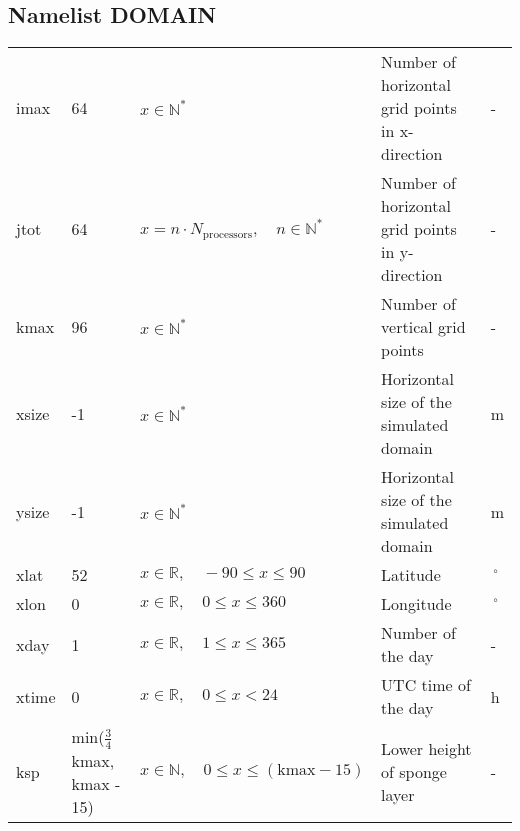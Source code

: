 \documentclass[twoside,11pt,fleqn,a4paper,english,openright]{report}
\begin{document}
\subsection{Namelist DOMAIN}\label{par:domain}

\begin{center}
  \tablehead{
  }
  \tabletail{
  }
  \tablelasttail{
        &&&&\\\hline
  }
\begin{supertabular}{|l|p{1.6cm}|p{5cm}|p{6.3cm}|l|}
  imax		& 64		& $x \in \mathbb{N}^*$	& Number of horizontal grid points in x-direction	& -\\
  jtot		& 64		& $x = n \cdot N_{\text{processors}}, \quad n \in \mathbb{N}^*$	& Number of horizontal grid points in y-direction	& -\\
  kmax		& 96		& $x \in \mathbb{N}^*$		& Number of vertical grid points		& -\\
  xsize		& -1		& $x \in \mathbb{N}^*$		& Horizontal size of the simulated domain	& m\\
  ysize		& -1		& $x \in \mathbb{N}^*$		& Horizontal size of the simulated domain	& m\\
  xlat		& 52	& $x \in \mathbb{R}, \quad -90 \leq x \leq 90$			& Latitude					& $\,^{\circ}$\\
  xlon		& 0		& $x \in \mathbb{R}, \quad 0 \leq x \leq 360$			& Longitude					& $\,^{\circ}$\\
  xday		& 1		& $x \in \mathbb{R}, \quad 1 \leq x \leq 365$	& Number of the day				& -\\
  xtime		& 0		& $x \in \mathbb{R}, \quad 0 \leq x < 24$	& UTC time of the day				& h\\
  ksp		& \scriptsize min($\frac{3}{4}$kmax, kmax - 15)	& $x \in \mathbb{N}, \quad 0 \leq x \leq (\text{kmax} - 15)$	& Lower height of sponge layer			& -\\
\end{supertabular}
\end{center}
\end{document}
